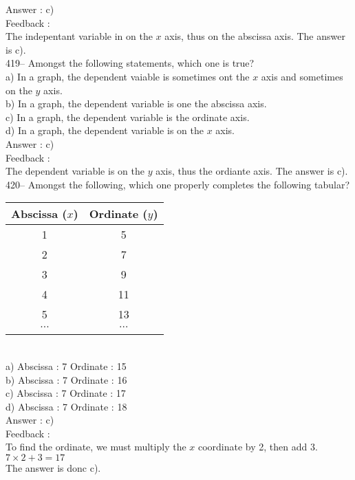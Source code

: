 \documentclass[letterpaper, 12pt]{article}
\begin{document}
Answer : c)\\

Feedback :\\
The indepentant variable in on the $x$ axis, thus on the abscissa axis. The answer is c).\\

419-- Amongst the following statements, which one is true?\\
a) In a graph, the dependent vaiable is sometimes ont the $x$ axis and sometimes on the $y$ axis.  \\
b) In a graph, the dependent variable is one the abscissa axis.\\
c) In a graph, the dependent variable is the ordinate axis.\\
d) In a graph, the dependent variable is on the $x$ axis.\\

Answer : c)\\

Feedback :\\
The dependent variable is on the $y$ axis, thus the ordiante axis.  The answer is c).\\


420-- Amongst the following, which one properly completes the following tabular?\\
\begin{tabular}{|c|c|} \hline
{\bf Abscissa ($x$)} & {\bf Ordinate ($y$)}  \\ \hline \hline

1 & 5 \\ \hline
2 & 7 \\ \hline
3 & 9 \\ \hline
4 & 11 \\ \hline
5 & 13 \\ \hline
$\ldots$ & $\ldots$ \\ \hline
\multicolumn{2}{c}{}\\
\end{tabular}\\
a) Abscissa : 7 \qquad Ordinate : 15\\
b) Abscissa : 7 \qquad Ordinate : 16\\
c) Abscissa : 7 \qquad Ordinate : 17\\
d) Abscissa : 7 \qquad Ordinate : 18\\

Answer : c)\\

Feedback :\\
To find the ordinate, we must multiply the $x$ coordinate by 2,
then add 3.  \\
$7\times2+3=17$\\
The answer is donc c).\\
\end{document}
